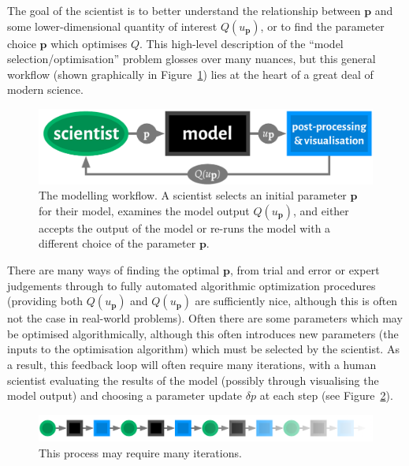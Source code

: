 \documentclass[a4paper,fontsize=12pt]{scrartcl}
\begin{document}
The goal of the scientist is to better understand the relationship
between $\mathbf{p}$ and some lower-dimensional quantity of interest
$Q(u_{\mathbf{p}})$, or to find the parameter choice $\mathbf{p}$
which optimises $Q$. %
This high-level description of the ``model selection/optimisation''
problem glosses over many nuances, but this general workflow (shown
graphically in Figure~\ref{fig:general-fb-loop}) lies at the heart of
a great deal of modern science.

\begin{figure}
  \centering
  \includegraphics[width=.75\textwidth]{figures/general-fb-loop.pdf}
  \caption{The modelling workflow. A scientist selects an initial
    parameter $\mathbf{p}$ for their model, examines the model output
    $Q(u_{\mathbf{p}})$, and either accepts the output of the model
    or re-runs the model with a different choice of the parameter
    $\mathbf{p}$.}
  \label{fig:general-fb-loop}
\end{figure}

There are many ways of finding the optimal $\mathbf{p}$, from trial
and error or expert judgements through to fully automated algorithmic
optimization procedures (providing both $Q(u_{\mathbf{p}})$ and
$Q(u_{\mathbf{p}})$ are sufficiently nice, although this is often not
the case in real-world problems). Often there are some parameters
which may be optimised algorithmically, although this often introduces
new parameters (the inputs to the optimisation algorithm) which must
be selected by the scientist. As a result, this feedback loop will
often require many iterations, with a human scientist evaluating the
results of the model (possibly through visualising the model output)
and choosing a parameter update $\delta p$ at each step (see
Figure~\ref{fig:unrolled-fb-loop}).

\begin{figure}
  \centering
  \includegraphics[width=\textwidth]{figures/unrolled-fb-loop.pdf}
  \caption{This process may require many iterations.}
  \label{fig:unrolled-fb-loop}
\end{figure}
\end{document}
